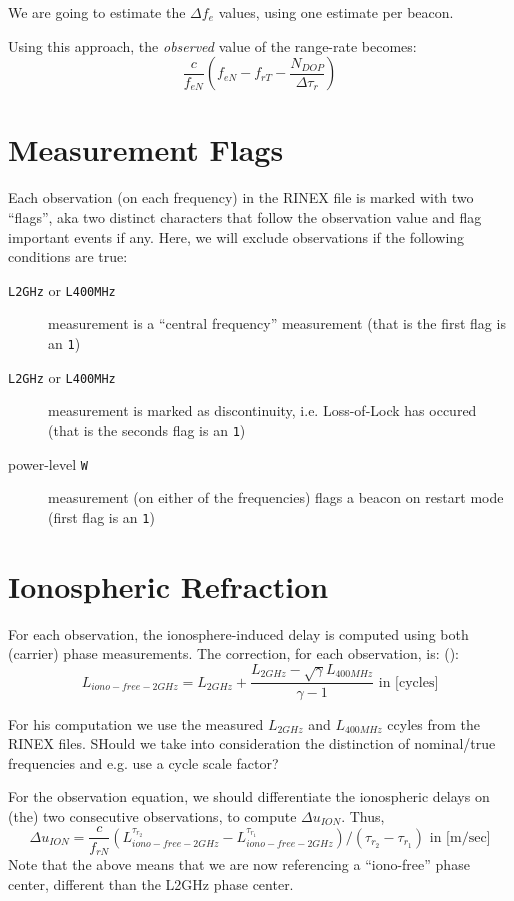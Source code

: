 We are going to estimate the $\Delta f_e$ values, using one estimate per beacon.

Using this approach, the \emph{observed} value of the range-rate becomes:
\begin{equation}
  \frac{c}{f_{eN}} \left( f_{eN} - f_{rT} - \frac{N_{DOP}}{\Delta \tau_{r}} \right) 
\end{equation}

\section{Measurement Flags}
\label{sec:measurement-flags}
Each observation (on each frequency) in the RINEX file is marked with two ``flags'', 
aka two distinct characters that follow the observation value and flag important 
events if any. Here, we will exclude observations if the following conditions are true:
\begin{description}
  \item[\texttt{L2GHz} or \texttt{L400MHz}] measurement is a ``central frequency'' 
  measurement (that is the first flag is an \texttt{1})
  \item[\texttt{L2GHz} or \texttt{L400MHz}] measurement is marked as discontinuity, 
  i.e. Loss-of-Lock has occured (that is the seconds flag is an \texttt{1})
  \item[power-level \texttt{W}] measurement (on either of the frequencies) flags 
  a beacon on restart mode (first flag is an \texttt{1})
\end{description}

\section{Ionospheric Refraction}
\label{sec:ionospheric-refraction}
For each observation, the ionosphere-induced delay is computed using both 
(carrier) phase measurements. The correction, for each observation, is: 
(\cite{lemoine-2016}):
\begin{equation}
  L_{iono-free-2GHz} = L_{2GHz} 
    + \frac{L_{2GHz} - \sqrt \gamma L_{400MHz}}{\gamma - 1} 
    \text{ in [cycles]}
\end{equation}

{\color{brown}For his computation we use the measured $L_{2GHz}$ and $L_{400MHz}$ 
ccyles from the RINEX files. SHould we take into consideration the distinction 
of nominal/true frequencies and e.g. use a cycle scale factor?}

For the observation equation, we should differentiate the ionospheric delays on 
(the) two consecutive observations, to compute $\Delta u_{ION}$. Thus,
\begin{equation}
  \Delta u_{ION} = \frac{c}{f_{rN}} \left( L_{iono-free-2GHz}^{\tau_{r_2}} 
    - L_{iono-free-2GHz}^{\tau_{r_1}} \right) / (\tau_{r_2} - \tau_{r_1})
    \text{ in [m/sec]}
\end{equation}
Note that the above means that we are now referencing a ``iono-free'' phase center, 
different than the L2GHz phase center.

